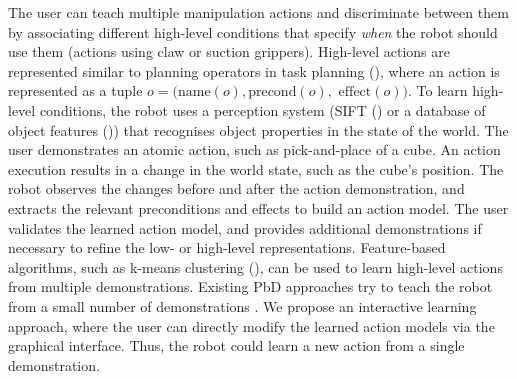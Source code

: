 The user can teach multiple manipulation actions and discriminate between them by associating different high-level conditions that specify \textit{when} the robot should use them (\eg actions using claw or suction grippers).
High-level actions are represented similar to planning operators in task planning (), where an action is represented as a tuple $o = (\text{name}(o), \text{precond}(o),$ $\text{effect}(o))$.
To learn high-level conditions, the robot uses a perception system (\eg SIFT (\cite{ahmadzadeh2015learning}) or a database of object features (\cite{mason2011robot})) that recognises object properties in the state of the world.
The user demonstrates an atomic action, such as pick-and-place of a cube. %
An action execution results in a change in the world state, such as the cube's position.
The robot observes the changes before and after the action demonstration, and extracts the relevant preconditions and effects to build an action model. %
The user validates the learned action model, and provides additional demonstrations if necessary to refine the low- or high-level representations.
Feature-based algorithms, such as k-means clustering (\cite{mollard2015robot,abdo2013learning}), can be used to learn high-level actions from multiple demonstrations.
Existing PbD approaches try to teach the robot from a small number of demonstrations \cite{orendt2016robot,abdo2013learning}.
We propose an interactive learning approach, where the user can directly modify the learned action models via the graphical interface.
Thus, the robot could learn a new action from a single demonstration.





